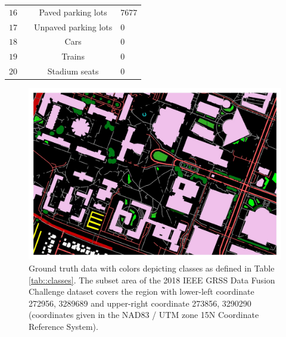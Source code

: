 \documentclass[
twocolumn,
]{ceurart}
\begin{document}
\begin{table}
\begin{tabular}{NNcZ}
$16$ & \colorbox[rgb]{1.,1.,0.}{\textcolor{white}{\phantom{A}}} & Paved parking lots & $7677$ \\
$17$ & \colorbox[rgb]{0.92, 0.44, 0.}{\textcolor{white}{\phantom{A}}} & Unpaved parking lots & $0$ \\
$18$ & \colorbox[rgb]{0.98, 0.  , 1.}{\textcolor{white}{\phantom{A}}} & Cars & $0$ \\
$19$ & \colorbox[rgb]{0.  , 0.  , 1.}{\textcolor{white}{\phantom{A}}} & Trains & $0$ \\
$20$ & \colorbox[rgb]{0.49, 0.76, 0.8}{\textcolor{white}{\phantom{A}}} & Stadium seats & $0$ \\
\hline
\end{tabular}
\end{table}

\begin{figure}[!t]
\centering
\includegraphics[width=\columnwidth]{figures/gt.jpg}
\caption{Ground truth data with colors depicting classes as defined in Table \ref{tab::classes}. The subset area of the 2018 IEEE GRSS Data Fusion Challenge dataset covers the region with lower-left coordinate 272956, 3289689 and upper-right coordinate 273856, 3290290 (coordinates given in the NAD83 / UTM zone 15N Coordinate Reference System).}
\label{fig::gt}
\end{figure}
\end{document}
